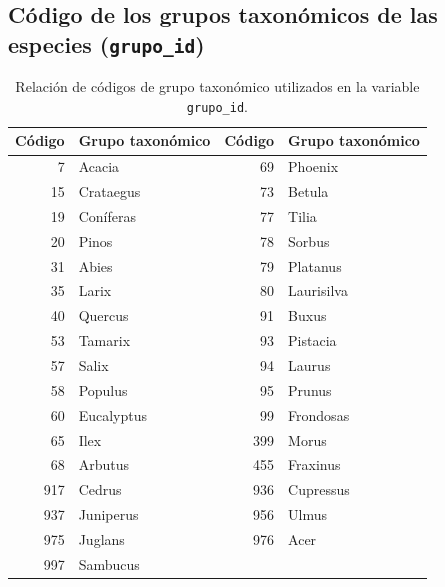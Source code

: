 \subsection{Código de los grupos taxonómicos de las especies (\texttt{grupo\_id})}\label{sec:gruposespecies}
\begin{table}
    \centering
    \small
    \renewcommand{\arraystretch}{1.1}
    \setlength{\tabcolsep}{6pt}
    \caption{Relación de códigos de grupo taxonómico utilizados en la variable \texttt{grupo\_id}.}
    \begin{tabular}{rl|rl}
        \toprule
        \textbf{Código} & \textbf{Grupo taxonómico} & \textbf{Código} & \textbf{Grupo taxonómico} \\
        \midrule
        7               & Acacia                    & 69              & Phoenix                   \\
        15              & Crataegus                 & 73              & Betula                    \\
        19              & Coníferas                 & 77              & Tilia                     \\
        20              & Pinos                     & 78              & Sorbus                    \\
        31              & Abies                     & 79              & Platanus                  \\
        35              & Larix                     & 80              & Laurisilva                \\
        40              & Quercus                   & 91              & Buxus                     \\
        53              & Tamarix                   & 93              & Pistacia                  \\
        57              & Salix                     & 94              & Laurus                    \\
        58              & Populus                   & 95              & Prunus                    \\
        60              & Eucalyptus                & 99              & Frondosas                 \\
        65              & Ilex                      & 399             & Morus                     \\
        68              & Arbutus                   & 455             & Fraxinus                  \\
        917             & Cedrus                    & 936             & Cupressus                 \\
        937             & Juniperus                 & 956             & Ulmus                     \\
        975             & Juglans                   & 976             & Acer                      \\
        997             & Sambucus                  &                 &                           \\
        \bottomrule
    \end{tabular}
\end{table}


